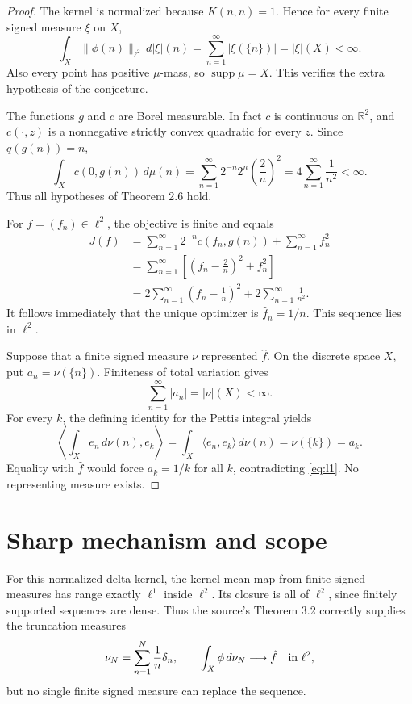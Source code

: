 \documentclass[11pt]{article}
\newcommand{\R}{\mathbb R}
\begin{document}
\begin{proof}
The kernel is normalized because $K(n,n)=1$.  Hence for every finite signed
measure $\xi$ on $X$,
\[
 \int_X\|\phi(n)\|_{\ell^2}\,d|\xi|(n)
 =\sum_{n=1}^{\infty}|\xi(\{n\})|=|\xi|(X)<\infty.
\]
Also every point has positive $\mu$-mass, so
$\operatorname{supp}\mu=X$.  This verifies the extra hypothesis of the
conjecture.

The functions $g$ and $c$ are Borel measurable.  In fact $c$ is continuous
on $\R^2$, and $c(\cdot,z)$ is a nonnegative strictly convex quadratic for
every $z$.  Since $q(g(n))=n$,
\[
 \int_X c(0,g(n))\,d\mu(n)
 =\sum_{n=1}^{\infty}2^{-n}2^n\left(\frac2n\right)^2
 =4\sum_{n=1}^{\infty}\frac1{n^2}<\infty.
\]
Thus all hypotheses of Theorem 2.6 hold.

For $f=(f_n)\in\ell^2$, the objective is finite and equals
\begin{align*}
 J(f)
 &=\sum_{n=1}^{\infty}2^{-n}c(f_n,g(n))
   +\sum_{n=1}^{\infty}f_n^2\\
 &=\sum_{n=1}^{\infty}\left[\left(f_n-\frac2n\right)^2+f_n^2\right]\\
 &=2\sum_{n=1}^{\infty}\left(f_n-\frac1n\right)^2
   +2\sum_{n=1}^{\infty}\frac1{n^2}.
\end{align*}
It follows immediately that the unique optimizer is
$\hat f_n=1/n$.  This sequence lies in $\ell^2$.

Suppose that a finite signed measure $\nu$ represented $\hat f$.  On the
discrete space $X$, put $a_n=\nu(\{n\})$.  Finiteness of total variation gives
\begin{equation}\label{eq:l1}
 \sum_{n=1}^{\infty}|a_n|=|\nu|(X)<\infty.
\end{equation}
For every $k$, the defining identity for the Pettis integral yields
\[
 \left\langle\int_Xe_n\,d\nu(n),e_k\right\rangle
 =\int_X\langle e_n,e_k\rangle\,d\nu(n)=\nu(\{k\})=a_k.
\]
Equality with $\hat f$ would force $a_k=1/k$ for all $k$, contradicting
\eqref{eq:l1}.  No representing measure exists.
\end{proof}

\section*{Sharp mechanism and scope}

For this normalized delta kernel, the kernel-mean map from finite signed
measures has range exactly $\ell^1$ inside $\ell^2$.  Its closure is all of
$\ell^2$, since finitely supported sequences are dense.  Thus the source's
Theorem 3.2 correctly supplies the truncation measures
\[
 \nu_N=\sum_{n=1}^N\frac1n\delta_n,
 \qquad \int_X\phi\,d\nu_N\longrightarrow\hat f\quad\hbox{in }\ell^2,
\]
but no single finite signed measure can replace the sequence.
\end{document}

